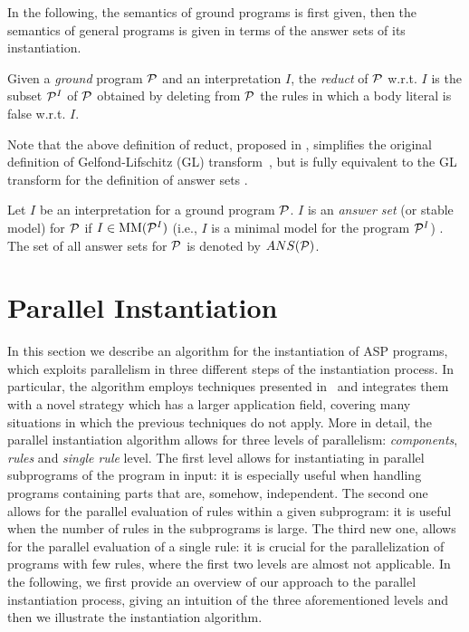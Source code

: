 \documentclass[preprint]{tlp}
\newcommand{\mm}[1]{\mbox{${\rm MM}(#1)$}}
\newcommand{\p}{\ensuremath{{\cal P}}\xspace}
\begin{document}
In the following, the semantics of ground programs is first given,
then the semantics of general programs is given in terms of the answer sets of its instantiation.

Given a {\em ground} program  $\p$ and an interpretation  $I$, the
{\em reduct} of $\p$ w.r.t. $I$ is the subset $\p^I$ of $\p$ obtained
by deleting from $\p$ the rules in which a body literal is false w.r.t. $I$.

Note that the above definition of reduct, proposed in
\cite{fabe-etal-2004-jelia}, simplifies the original definition of
Gelfond-Lifschitz (GL) transform~\cite{gelf-lifs-91}, but is fully
equivalent to the GL transform for the definition of answer sets
\cite{fabe-etal-2004-jelia}.

Let  $I$ be an interpretation for a ground program  $\p$.  $I$ is an {\em answer set} (or stable model)
for  $\p$ if $I \in \mm{\p^I}$ (i.e.,  $I$ is a minimal model for the program $\p^I$) \cite{fabe-etal-2004-jelia}.
The set of all answer sets for $\p$ is denoted by $ANS(\p)$.

\section{Parallel Instantiation}\label{sec:parallel}

In this section we describe an algorithm for the instantiation
of ASP programs, which exploits parallelism in three different
steps of the instantiation process. In particular, the algorithm
employs techniques presented in~\cite{cali-etal-2008-joacil}
and integrates them with a novel strategy which has a
larger application field, covering
many situations in which the previous techniques do not apply.
More in detail, the parallel instantiation algorithm
allows for three levels of parallelism:  {\em components}, {\em rules} and
{\em single rule} level. The first level allows for instantiating in
parallel subprograms of the program in input: it is especially
useful when handling programs containing parts that are,
somehow, independent. The second one allows for
the parallel evaluation of rules within a given subprogram: it is
 useful when the number of rules in the subprograms is large. The
third new one, allows for the parallel evaluation of a single rule:
it is crucial for the parallelization of
programs with few rules, where the first two levels are almost not
applicable.
In the following, we first provide an overview of our approach to the
parallel instantiation process, giving an intuition of the three
aforementioned levels and then we illustrate
the instantiation algorithm.
\end{document}
